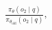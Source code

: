 \documentclass[preview]{standalone}
\begin{document}
\begin{align*}
\frac{\pi_\theta(o_2 \mid q)}{\pi_{\theta_{\text{old}}}(o_2 \mid q)},
\end{align*}
\end{document}
